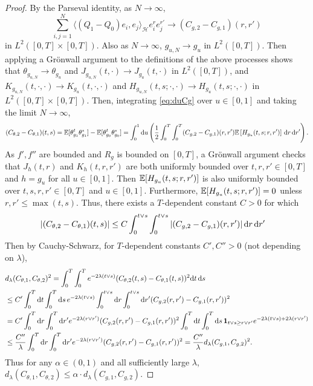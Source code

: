 \begin{proof}
By the Parseval identity, as $N \to \infty$,
\[\sum_{i,j=1}^N
    \bigl\langle (Q_1-Q_0)e_i,e_j\bigr\rangle_{\mathcal{H}}
    e_i^re_j^{r'} \to (C_{g,2}-C_{g,1})(r,r')
\]
in $L^2([0,T] \times [0,T])$.
Also as $N \to \infty$, $g_{u,N} \to g_u$ in $L^2([0,T])$. Then
applying a Gr\"onwall argument to the definitions of the above processes
shows that $\theta_{g_{u,N}} \to \theta_{g_u}$ and
$J_{g_{u,N}}(t,\cdot) \to J_{g_u}(t,\cdot)$
in $L^2([0,T])$, and $K_{g_{u,N}}(t,\cdot,\cdot) \to
K_{g_u}(t,\cdot,\cdot)$ and
$H_{g_{u,N}}(t,s;\cdot,\cdot) \to H_{g_u}(t,s;\cdot,\cdot)$
in $L^2([0,T] \times [0,T])$. Then,
integrating \eqref{eq:duCg} over $u \in [0,1]$ and taking the limit $N \to
\infty$,
\[(C_{\theta,2}-C_{\theta,1})(t,s)
=\mathbb{E}[\theta_{g_1}^t\theta_{g_1}^s]
-\mathbb{E}[\theta_{g_0}^t\theta_{g_0}^s]
    =\int_0^1 \mathrm{d} u\left(
    \frac12
    \int_0^T\int_0^T
    (C_{g,2}-C_{g,1})(r,r')
    \mathbb{E}\left[
        H_{g_u}(t,s;r,r')
    \right]
    \,\mathrm{d} r\,\mathrm{d} r'\right).
\]
As $f',f''$ are bounded and $R_g$ is bounded on $[0,T]$,
a Gr\"onwall argument checks that $J_h(t,r)$ and $K_h(t,r,r')$ are both uniformly
bounded over $t,r,r' \in [0,T]$ and $h =g_u$ for all $u \in [0,1]$. Then
$\mathbb{E}[H_{g_u}(t,s;r,r')]$ is also uniformly bounded over $t,s,r,r' \in [0,T]$
and $u \in [0,1]$.  Furthermore, $\mathbb{E}[H_{g_u}(t,s;r,r')]=0$ unless $r,r' \leq
\max(t,s)$. Thus, there exists a $T$-dependent constant $C>0$ for which
\begin{align*}
|(C_{\theta,2}-C_{\theta,1})(t,s)|
&\leq C\int_0^{t \vee s}\int_0^{t \vee s}
    |(C_{g,2}-C_{g,1})(r,r')|\,\mathrm{d} r\,\mathrm{d} r'
\end{align*}
Then by Cauchy-Schwarz, for $T$-dependent constants $C',C''>0$ (not depending on
$\lambda$),
\begin{align*}
&d_\lambda(C_{\theta,1},C_{\theta,2})^2
=\int_0^T \int_0^T e^{-2\lambda(t \vee s)}
(C_{\theta,2}(t,s)-C_{\theta,1}(t,s))^2\mathrm{d} t\,\mathrm{d} s\\
&\leq C'\int_0^T\mathrm{d} t\int_0^T \mathrm{d} s\,
e^{-2\lambda(t \vee s)}
\int_0^{t \vee s}\mathrm{d} r\int_0^{t \vee s} \mathrm{d} r'
    (C_{g,2}(r,r')-C_{g,1}(r,r'))^2\\
&=C'\int_0^T \mathrm{d} r\int_0^T \mathrm{d} r'
e^{-2\lambda(r \vee r')}
(C_{g,2}(r,r')-C_{g,1}(r,r'))^2
\mathop{\int_0^T \mathrm{d} t\int_0^T\mathrm{d} s} \mathbf{1}_{t \vee s \geq r \vee r'}
e^{-2\lambda(t \vee s)+2\lambda(r \vee r')}\\
&\leq \frac{C''}{\lambda}
\int_0^T \mathrm{d} r\int_0^T \mathrm{d} r'
e^{-2\lambda(r \vee r')}
(C_{g,2}(r,r')-C_{g,1}(r,r'))^2
=\frac{C''}{\lambda}d_\lambda(C_{g,1},C_{g,2})^2.
\end{align*}
Thus for any $\alpha \in (0,1)$ and all sufficiently large $\lambda$,
$d_\lambda(C_{\theta,1},C_{\theta,2}) \leq
\alpha \cdot d_\lambda(C_{g,1},C_{g,2})$.


\end{proof}
